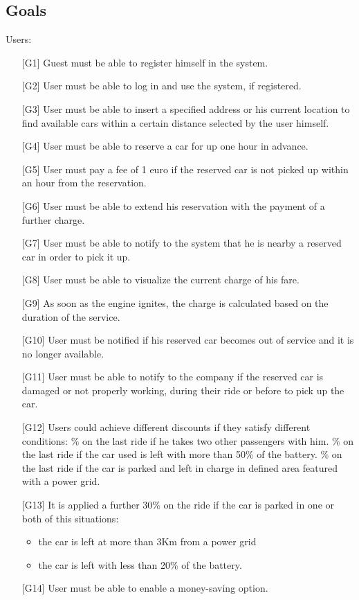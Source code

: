 \documentclass[10pt, a4paper,titlepage]{article}
\begin{document}
\subsection{Goals}
\label{sec:goals}
Users:
\begin{itemize}
\item [{[G1]}] Guest must be able to register himself in the system.
\item [{[G2]}] User must be able to log in and use the system, if registered.
\item [{[G3]}] User must be able to insert a specified address or his current location to find available cars within a certain distance selected by the user himself.
\item [{[G4]}] User must be able to reserve a car for up one hour in advance.
\item [{[G5]}] User must pay a fee of 1 euro if the reserved car is not picked up within an hour from the reservation.
\item [{[G6]}] User must be able to extend his reservation with the payment of a further charge.
\item [{[G7]}] User must be able to notify to the system that he is nearby a reserved car in order to pick it up. 
\item [{[G8]}] User must be able to visualize the current charge of his fare.
\item [{[G9]}] As soon as the engine ignites, the charge is calculated based on the duration of the service.
\item [{[G10]}] User must be notified if his reserved car becomes out of service and it is no longer available.
\item [{[G11]}] User must be able to notify to the company if the reserved car is damaged or not properly working, during their ride or before to pick up the car.
\item [{[G12]}] Users could achieve different discounts if they satisfy different conditions:
\% on the last ride if he takes two other passengers with him.
\% on the last ride if the car used is left with more than 50\% of the battery.
\% on the last ride if the car is parked and left in charge in defined area featured with a power grid.
\item [{[G13]}] It is applied a further 30\% on the ride if the car is parked in one or both of this situations:
\begin{itemize}
\item the car is left at more than 3Km from a power grid
\item the car is left with less than 20\% of the battery.
\end{itemize}
\item[{[G14]}] User must be able to enable a money-saving option.
\end{itemize}
\end{document}

